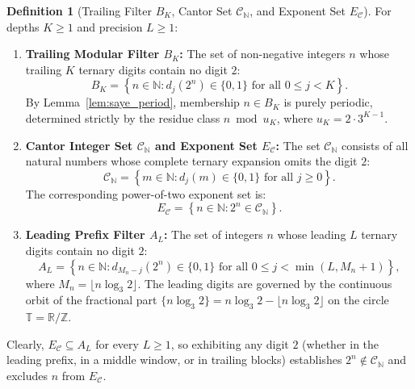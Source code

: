 \documentclass[11pt,reqno]{amsart}
\theoremstyle{plain}
\theoremstyle{definition}
\newtheorem{definition}[theorem]{Definition}
\theoremstyle{remark}
\newcommand{\R}{\mathbb{R}}
\newcommand{\N}{\mathbb{N}}
\newcommand{\Z}{\mathbb{Z}}
\begin{document}
\begin{definition}[Trailing Filter $B_K$, Cantor Set $\mathcal{C}_{\mathbb{N}}$, and Exponent Set $E_{\mathcal{C}}$]\label{def:filters}
For depths $K \ge 1$ and precision $L \ge 1$:
\begin{enumerate}
    \item \textbf{Trailing Modular Filter $B_K$:} The set of non-negative integers $n$ whose trailing $K$ ternary digits contain no digit $2$:
    \begin{equation}
    B_K = \left\{ n \in \N : d_j(2^n) \in \{0, 1\} \text{ for all } 0 \le j < K \right\}.
    \end{equation}
    By Lemma~\ref{lem:saye_period}, membership $n \in B_K$ is purely periodic, determined strictly by the residue class $n \bmod u_K$, where $u_K = 2 \cdot 3^{K-1}$.
    \item \textbf{Cantor Integer Set $\mathcal{C}_{\mathbb{N}}$ and Exponent Set $E_{\mathcal{C}}$:} The set $\mathcal{C}_{\mathbb{N}}$ consists of all natural numbers whose complete ternary expansion omits the digit $2$:
    \begin{equation}
    \mathcal{C}_{\mathbb{N}} = \left\{ m \in \N : d_j(m) \in \{0, 1\} \text{ for all } j \ge 0 \right\}.
    \end{equation}
    The corresponding power-of-two exponent set is:
    \begin{equation}
    E_{\mathcal{C}} = \left\{ n \in \N : 2^n \in \mathcal{C}_{\mathbb{N}} \right\}.
    \end{equation}
    \item \textbf{Leading Prefix Filter $A_L$:} The set of integers $n$ whose leading $L$ ternary digits contain no digit $2$:
    \begin{equation}
    A_L = \left\{ n \in \N : d_{M_n - j}(2^n) \in \{0, 1\} \text{ for all } 0 \le j < \min(L, M_n + 1) \right\},
    \end{equation}
    where $M_n = \lfloor n \log_3 2 \rfloor$. The leading digits are governed by the continuous orbit of the fractional part $\{ n \log_3 2 \} = n \log_3 2 - \lfloor n \log_3 2 \rfloor$ on the circle $\mathbb{T} = \R / \Z$.
\end{enumerate}
\end{definition}

Clearly, $E_{\mathcal{C}} \subseteq A_L$ for every $L \ge 1$, so exhibiting any digit $2$ (whether in the leading prefix, in a middle window, or in trailing blocks) establishes $2^n \notin \mathcal{C}_{\mathbb{N}}$ and excludes $n$ from $E_{\mathcal{C}}$. 
\end{document}
